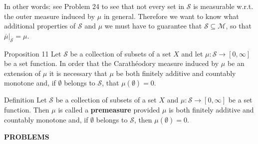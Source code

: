 In other words: see Problem 24 to see that not every set in $\mathcal{S}$ is measurable w.r.t. the outer measure induced by $\mu$ in general.
Therefore we want to know what additional properties of $\mathcal{S}$ and $\mu$ we must have to guarantee that $\mathcal{S}\subseteq\mathcal{M}$, so that $\overline{\mu}|_\mathcal{S}=\mu$. 
\begin{namedthm*}{Proposition 11}
	Let $\mathcal{S}$ be a collection of subsets of a set $X$ and let $\mu:\mathcal{S}\to[0,\infty]$ be a set function.
	In order that the Carath\'eodory measure induced by $\mu$ be an extension of $\mu$ it is necessary that $\mu$ be both finitely additive and countably monotone and, if $\emptyset$ belongs to $\mathcal{S}$, that $\mu(\emptyset)=0$.
\end{namedthm*}
\begin{namedthm*}{Definition}
	Let $\mathcal{S}$ be a collection of subsets of a set $X$ and $\mu:\mathcal{S}\to[0,\infty]$ be a set function.
	Then $\mu$ is called a \textbf{premeasure} provided $\mu$ is both finitely additive and countably monotone and, if $\emptyset$ belongs to $\mathcal{S}$, then $\mu(\emptyset)=0$.
\end{namedthm*}
\begin{center}
	\textbf{PROBLEMS}
\end{center}
